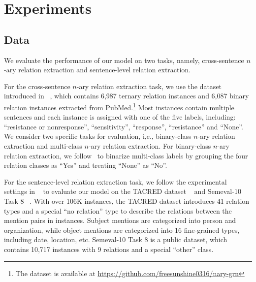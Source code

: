 \documentclass[11pt,a4paper]{article}
\begin{document}
\section{Experiments}



\subsection{Data}
We evaluate the performance of our model on two tasks, namely,  cross-sentence $n$-ary relation extraction and sentence-level relation extraction. 

For the cross-sentence $n$-ary relation extraction task, we use the dataset introduced in ~\citep{Peng2017CrossSentenceNR}, which contains 6,987 ternary relation instances and 6,087 binary relation instances extracted from PubMed.\footnote{The dataset is available at \url{https://github.com/freesunshine0316/nary-grn}\label{n-ary_data}} Most instances contain multiple sentences and each instance is assigned with one of the five labels, including: ``resistance or nonresponse'', ``sensitivity'', ``response'', ``resistance''
and ``None''. We consider two specific tasks for evaluation, i,e., binary-class $n$-ary relation extraction and multi-class $n$-ary relation extraction.  For binary-class $n$-ary relation extraction, we follow~\citep{Peng2017CrossSentenceNR} to binarize multi-class labels by grouping the four relation classes as ``Yes'' and treating ``None'' as ``No''.  



For the sentence-level relation extraction task,  we follow the experimental settings in ~\citep{Zhang2018GraphCO} to evaluate our model on the TACRED dataset ~\citep{Zhang2017PositionawareAA} and Semeval-10 Task 8 ~\citep{Hendrickx2010SemEval2010T8}. With over 106K instances, the TACRED dataset introduces 41 relation types and a special ``no relation'' type to describe the relations between the mention pairs in instances. Subject mentions are categorized into person and organization, while object mentions are categorized into 16 fine-grained types, including date, location, etc. Semeval-10 Task 8 is a public dataset, which contains 10,717 instances with 9 relations and a special ``other'' class. 
\end{document}
